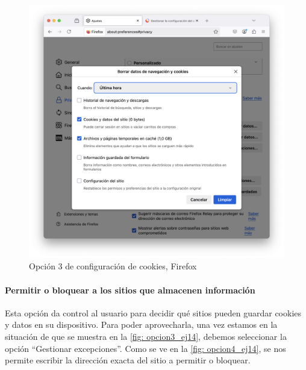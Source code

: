 \begin{figure}[H]   
    \includegraphics[width=15cm]{opcion3_ej14.png}
    \caption{Opción 3 de configuración de cookies, Firefox}
    \label{fig:opcion3_ej14}
\end{figure}

\paragraph{Permitir o bloquear a los sitios que almacenen información }

Esta opción da control al usuario para decidir qué sitios pueden guardar cookies y datos en su dispositivo. Para poder aprovecharla, una vez estamos en la situación de que se muestra en la \ref{fig: opcion3_ej14}, debemos seleccionar la opción “Gestionar excepciones”. Como se ve en la \ref{fig: opcion4_ej14}, se nos permite escribir la dirección exacta del sitio a permitir o bloquear. 

